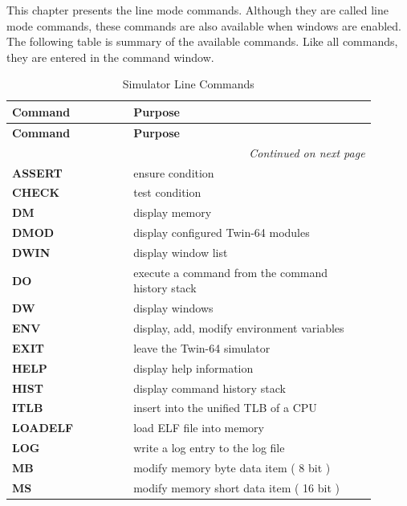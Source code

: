
This chapter presents the line mode commands. Although they are called line mode commands, these commands are also available when windows are enabled. The following table is summary of the available commands. Like all commands, they are entered in the command window.


\begin{longtable}{@{}p{0.3\linewidth}p{0.6\linewidth}@{}}
    \caption{Simulator Line Commands} \\
    \toprule
    \textbf{Command} & \textbf{Purpose} \\
    \midrule
    \endfirsthead
    \toprule
     \textbf{Command} & \textbf{Purpose} \\
    \midrule
    \endhead
    \midrule
    \multicolumn{2}{r}{\textit{Continued on next page}} \\
    \midrule
    \endfoot
    \bottomrule
    \endlastfoot
    \textbf{ASSERT} & ensure condition \\
	\midrule
	\textbf{CHECK} & test condition \\
	\midrule
    \textbf{DM} & display memory \\
	\midrule
	\textbf{DMOD} & display configured Twin-64 modules \\
	\midrule
	\textbf{DWIN} & display window list \\
	\midrule
	\textbf{DO} & execute a command from the command history stack \\
	\midrule
	\textbf{DW} & display windows \\
	\midrule
	\textbf{ENV} & display, add, modify environment variables \\
	\midrule
	\textbf{EXIT} & leave the Twin-64 simulator \\
	\midrule
	\textbf{HELP} & display help information \\
	\midrule
	\textbf{HIST} & display command history stack \\
	\midrule
	\textbf{ITLB} & insert into the unified TLB of a CPU \\
	\midrule
	\textbf{LOADELF} & load ELF file into memory \\
	\midrule
	\textbf{LOG} & write a log entry to the log file \\
	\midrule
	\textbf{MB} & modify memory byte data item ( 8 bit )\\
	\midrule
	\textbf{MS} & modify memory short data item ( 16 bit )\\

\end{longtable}
